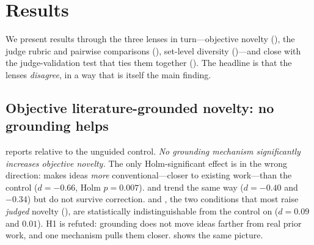\section{Results}
\label{sec:results}

We present results through the three lenses in turn---objective novelty (), the judge rubric and pairwise comparisons (), set-level diversity ()---and close with the judge-validation test that ties them together (). The headline is that the lenses \emph{disagree}, in a way that is itself the main finding.

\subsection{Objective literature-grounded novelty: no grounding helps}
\label{sec:res_lgn}

 reports \lgn relative to the unguided control. \emph{No grounding mechanism significantly increases objective novelty.} The only Holm-significant effect is in the wrong direction: \proposal makes ideas \emph{more} conventional---closer to existing work---than the control ($d = -0.66$, Holm $p = 0.007$). \induction and \outcome trend the same way ($d = -0.40$ and $-0.34$) but do not survive correction. \deduction and \litcomp, the two conditions that most raise \emph{judged} novelty (), are statistically indistinguishable from the control on \lgn ($d = 0.09$ and $0.01$). H1 is refuted: grounding does not move ideas farther from real prior work, and one mechanism pulls them closer.  shows the same picture.

